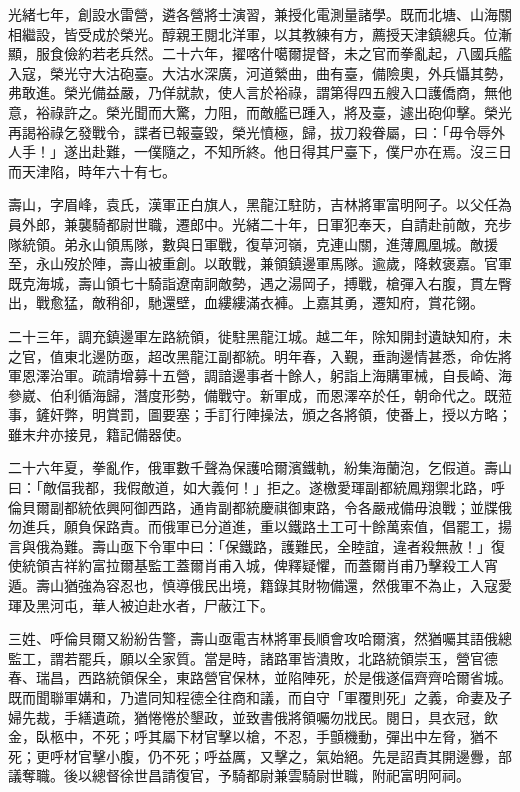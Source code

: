 \begin{pinyinscope}
光緒七年，創設水雷營，遴各營將士演習，兼授化電測量諸學。既而北塘、山海關相繼設，皆受成於榮光。醇親王閱北洋軍，以其教練有方，薦授天津鎮總兵。位漸顯，服食儉約若老兵然。二十六年，擢喀什噶爾提督，未之官而拳亂起，八國兵艦入寇，榮光守大沽砲臺。大沽水深廣，河道縈曲，曲有臺，備險奧，外兵懾其勢，弗敢進。榮光備益嚴，乃佯就款，使人言於裕祿，謂第得四五艘入口護僑商，無他意，裕祿許之。榮光聞而大驚，力阻，而敵艦已踵入，將及臺，遽出砲仰擊。榮光再謁裕祿乞發戰令，諜者已報臺毀，榮光憤極，歸，拔刀殺眷屬，曰：「毋令辱外人手！」遂出赴難，一僕隨之，不知所終。他日得其尸臺下，僕尸亦在焉。沒三日而天津陷，時年六十有七。

壽山，字眉峰，袁氏，漢軍正白旗人，黑龍江駐防，吉林將軍富明阿子。以父任為員外郎，兼襲騎都尉世職，遷郎中。光緒二十年，日軍犯奉天，自請赴前敵，充步隊統領。弟永山領馬隊，數與日軍戰，復草河嶺，克連山關，進薄鳳凰城。敵援至，永山歿於陣，壽山被重創。以敢戰，兼領鎮邊軍馬隊。逾歲，降敕褒嘉。官軍既克海城，壽山領七十騎詣遼南詗敵勢，遇之湯岡子，搏戰，槍彈入右腹，貫左臀出，戰愈猛，敵稍卻，馳還壁，血縷縷滿衣褲。上嘉其勇，遷知府，賞花翎。

二十三年，調充鎮邊軍左路統領，徙駐黑龍江城。越二年，除知開封遺缺知府，未之官，值東北邊防亟，超改黑龍江副都統。明年春，入覲，垂詢邊情甚悉，命佐將軍恩澤治軍。疏請增募十五營，調諳邊事者十餘人，躬詣上海購軍械，自長崎、海參崴、伯利循海歸，潛度形勢，備戰守。新軍成，而恩澤卒於任，朝命代之。既蒞事，鏟奸弊，明賞罰，圖要塞；手訂行陣操法，頒之各將領，使番上，授以方略；雖末弁亦接見，籍記備器使。

二十六年夏，拳亂作，俄軍數千聲為保護哈爾濱鐵軌，紛集海蘭泡，乞假道。壽山曰：「敵偪我都，我假敵道，如大義何！」拒之。遂檄愛琿副都統鳳翔禦北路，呼倫貝爾副都統依興阿御西路，通肯副都統慶祺御東路，令各嚴戒備毋浪戰；並牒俄勿進兵，願負保路責。而俄軍已分道進，重以鐵路土工可十餘萬索值，倡罷工，揚言與俄為難。壽山亟下令軍中曰：「保鐵路，護難民，全睦誼，違者殺無赦！」復使統領吉祥約富拉爾基監工蓋爾肖甫入城，俾釋疑懼，而蓋爾肖甫乃擊殺工人宵遁。壽山猶強為容忍也，慎導俄民出境，籍錄其財物備還，然俄軍不為止，入寇愛琿及黑河屯，華人被迫赴水者，尸蔽江下。

三姓、呼倫貝爾又紛紛告警，壽山亟電吉林將軍長順會攻哈爾濱，然猶囑其語俄總監工，謂若罷兵，願以全家質。當是時，諸路軍皆潰敗，北路統領崇玉，營官德春、瑞昌，西路統領保全，東路營官保林，並陷陣死，於是俄遂偪齊齊哈爾省城。既而聞聯軍媾和，乃遣同知程德全往商和議，而自守「軍覆則死」之義，命妻及子婦先裁，手繕遺疏，猶惓惓於墾政，並致書俄將領囑勿戕民。閱日，具衣冠，飲金，臥柩中，不死；呼其屬下材官擊以槍，不忍，手顫機動，彈出中左脅，猶不死；更呼材官擊小腹，仍不死；呼益厲，又擊之，氣始絕。先是詔責其開邊釁，部議奪職。後以總督徐世昌請復官，予騎都尉兼雲騎尉世職，附祀富明阿祠。


\end{pinyinscope}
